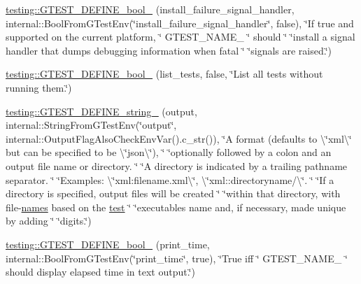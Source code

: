 \begin{DoxyCompactItemize}
\item 
\mbox{\hyperlink{namespacetesting_ad37eab296e354d74a81e2cedc34ac6b8}{testing\+::\+G\+T\+E\+S\+T\+\_\+\+D\+E\+F\+I\+N\+E\+\_\+bool\+\_\+}} (install\+\_\+failure\+\_\+signal\+\_\+handler, internal\+::\+Bool\+From\+G\+Test\+Env(\char`\"{}install\+\_\+failure\+\_\+signal\+\_\+handler\char`\"{}, false), \char`\"{}If true and supported on the current platform, \char`\"{} G\+T\+E\+S\+T\+\_\+\+N\+A\+M\+E\+\_\+ \char`\"{} should \char`\"{} \char`\"{}install a signal handler that dumps debugging information when fatal \char`\"{} \char`\"{}signals are raised.\char`\"{})
\item 
\mbox{\hyperlink{namespacetesting_a0fa31ecbf33c5e5970cca1d91c050153}{testing\+::\+G\+T\+E\+S\+T\+\_\+\+D\+E\+F\+I\+N\+E\+\_\+bool\+\_\+}} (list\+\_\+tests, false, \char`\"{}List all tests without running them.\char`\"{})
\item 
\mbox{\hyperlink{namespacetesting_a540064257c7d8030f84b886bc519aaf8}{testing\+::\+G\+T\+E\+S\+T\+\_\+\+D\+E\+F\+I\+N\+E\+\_\+string\+\_\+}} (output, internal\+::\+String\+From\+G\+Test\+Env(\char`\"{}output\char`\"{}, internal\+::\+Output\+Flag\+Also\+Check\+Env\+Var().c\+\_\+str()), \char`\"{}A format (defaults to \textbackslash{}\char`\"{}xml\textbackslash{}\char`\"{} but can be specified to be \textbackslash{}\char`\"{}json\textbackslash{}\char`\"{}), \char`\"{} \char`\"{}optionally followed by a colon and an output file name or directory. \char`\"{} \char`\"{}A directory is indicated by a trailing pathname separator. \char`\"{} \char`\"{}Examples\+: \textbackslash{}\char`\"{}xml\+:filename.\+xml\textbackslash{}\char`\"{}, \textbackslash{}\char`\"{}xml\+::directoryname/\textbackslash{}\char`\"{}. \char`\"{} \char`\"{}If a directory is specified, output files will be created \char`\"{} \char`\"{}within that directory, with file-\/\mbox{\hyperlink{_mutual_8h_a78a6dba1026eca68e2950c3857634cb3}{names}} based on the \mbox{\hyperlink{_mutual_8h_a707ee03719e99670bf6cfdfd897b8456}{test}} \char`\"{} \char`\"{}executable\textquotesingle{}s name and, if necessary, made unique by adding \char`\"{} \char`\"{}digits.\char`\"{})
\item 
\mbox{\hyperlink{namespacetesting_a766fcba2ec951940e528276919a5d22f}{testing\+::\+G\+T\+E\+S\+T\+\_\+\+D\+E\+F\+I\+N\+E\+\_\+bool\+\_\+}} (print\+\_\+time, internal\+::\+Bool\+From\+G\+Test\+Env(\char`\"{}print\+\_\+time\char`\"{}, true), \char`\"{}True iff \char`\"{} G\+T\+E\+S\+T\+\_\+\+N\+A\+M\+E\+\_\+ \char`\"{} should display elapsed time in text output.\char`\"{})
\item 

\end{DoxyCompactItemize}
